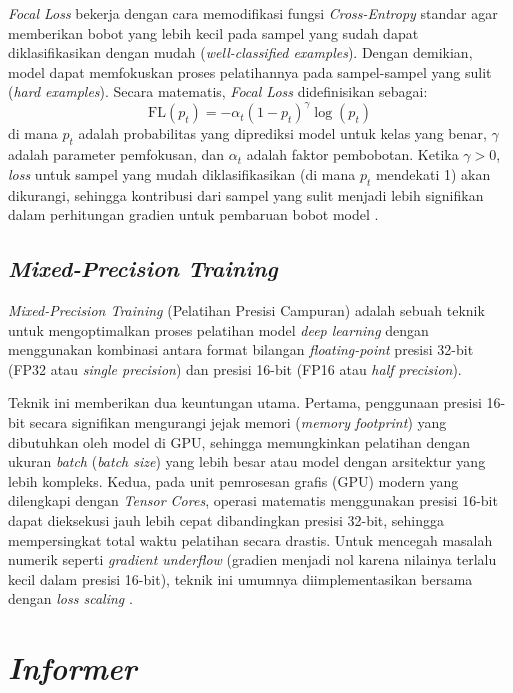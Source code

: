 \textit{Focal Loss} bekerja dengan cara memodifikasi fungsi \textit{Cross-Entropy} standar agar memberikan bobot yang lebih kecil pada sampel yang sudah dapat diklasifikasikan dengan mudah (\textit{well-classified examples}). Dengan demikian, model dapat memfokuskan proses pelatihannya pada sampel-sampel yang sulit (\textit{hard examples}). Secara matematis, \textit{Focal Loss} didefinisikan sebagai:
\begin{equation}
\text{FL}(p_t) = -\alpha_t (1 - p_t)^\gamma \log(p_t)
\end{equation}
di mana \(p_t\) adalah probabilitas yang diprediksi model untuk kelas yang benar, \(\gamma\) adalah parameter pemfokusan, dan \(\alpha_t\) adalah faktor pembobotan. Ketika \(\gamma > 0\), \textit{loss} untuk sampel yang mudah diklasifikasikan (di mana \(p_t\) mendekati 1) akan dikurangi, sehingga kontribusi dari sampel yang sulit menjadi lebih signifikan dalam perhitungan gradien untuk pembaruan bobot model \parencite{Lin2017FocalLoss}.

\subsection{\textit{Mixed-Precision Training}}

	\textit{Mixed-Precision Training} (Pelatihan Presisi Campuran) adalah sebuah teknik untuk mengoptimalkan proses pelatihan model 	\textit{deep learning} dengan menggunakan kombinasi antara format bilangan 	\textit{floating-point} presisi 32-bit (FP32 atau 	\textit{single precision}) dan presisi 16-bit (FP16 atau 	\textit{half precision}).

Teknik ini memberikan dua keuntungan utama. Pertama, penggunaan presisi 16-bit secara signifikan mengurangi jejak memori (\textit{memory footprint}) yang dibutuhkan oleh model di GPU, sehingga memungkinkan pelatihan dengan ukuran 	\textit{batch} (\textit{batch size}) yang lebih besar atau model dengan arsitektur yang lebih kompleks. Kedua, pada unit pemrosesan grafis (GPU) modern yang dilengkapi dengan \textit{Tensor Cores}, operasi matematis menggunakan presisi 16-bit dapat dieksekusi jauh lebih cepat dibandingkan presisi 32-bit, sehingga mempersingkat total waktu pelatihan secara drastis. Untuk mencegah masalah numerik seperti 	\textit{gradient underflow} (gradien menjadi nol karena nilainya terlalu kecil dalam presisi 16-bit), teknik ini umumnya diimplementasikan bersama dengan 	\textit{loss scaling} \parencite{Micikevicius2018MixedPrecision}.

\section{\textit{Informer}}

